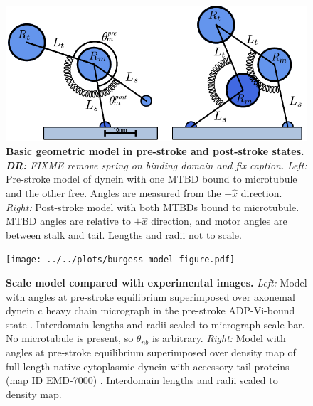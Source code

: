 \documentclass[9pt,twocolumn,twoside]{article}
\newcommand\davidsays[1]{{\em\color{blue} {\bf DR:} #1}}
\begin{document}
\begin{figure}[tbhp]
\centering
\includegraphics[width=1\linewidth]{figures/equilibrium-positions-final.pdf}
\caption{\textbf{Basic geometric model in pre-stroke and post-stroke states.}
\davidsays{FIXME remove spring on binding domain and fix caption.}
 \textit{Left: } Pre-stroke model of dynein with one MTBD bound to microtubule and the other free. Angles are measured from the $+\hat{x}$ direction. \textit{Right: } Post-stroke model with both MTBDs bound to microtubule. MTBD angles are relative to $+\hat{x}$ direction, and motor angles are between stalk and tail. Lengths and radii not to scale.}
\label{fig:model}
\end{figure}

\begin{figure}[tbhp]
\centering
\texttt{[image: ../../plots/burgess-model-figure.pdf]}%
\caption{\textbf{Scale model compared with experimental images.} \textit{Left:} Model with angles at pre-stroke equilibrium superimposed over axonemal dynein c heavy chain micrograph in the pre-stroke ADP-Vi-bound state \cite{burgess-paper}. Interdomain lengths and radii scaled to micrograph scale bar. No microtubule is present, so $\theta_{nb}$ is arbitrary. \textit{Right: } Model with angles at pre-stroke equilibrium superimposed over density map of full-length native cytoplasmic dynein with accessory tail proteins (map ID EMD-7000) \cite{grotjahn}. Interdomain lengths and radii scaled to density map.}
\label{fig:micrographs}
\end{figure}


\end{document}
